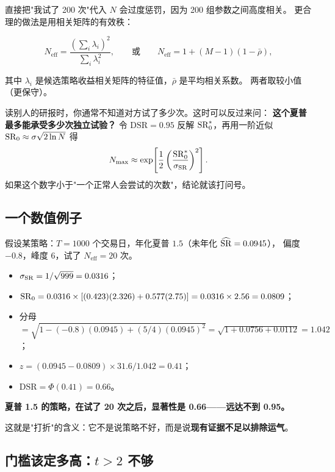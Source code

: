 直接把"我试了 200 次"代入 $N$ 会过度惩罚，因为 200 组参数之间高度相关。
更合理的做法是用相关矩阵的有效秩：

\begin{equation}
  N_{\text{eff}} = \frac{(\sum_i \lambda_i)^2}{\sum_i \lambda_i^2},
  \qquad \text{或} \qquad
  N_{\text{eff}} = 1 + (M-1)(1-\bar\rho),
  \label{eq:neff}
\end{equation}

其中 $\lambda_i$ 是候选策略收益相关矩阵的特征值，$\bar\rho$ 是平均相关系数。
两者取较小值（更保守）。

\begin{warnbox}[当试验次数未知时]
读别人的研报时，你通常不知道对方试了多少次。这时可以反过来问：
\textbf{这个夏普最多能承受多少次独立试验？}
令 $\mathrm{DSR}=0.95$ 反解 $\mathrm{SR}_0^*$，再用一阶近似 $\mathrm{SR}_0\approx\sigma\sqrt{2\ln N}$ 得
\begin{equation}
  N_{\max} \approx \exp\!\left[\frac12\left(\frac{\mathrm{SR}_0^*}{\sigma_{\mathrm{SR}}}\right)^2\right].
\end{equation}
如果这个数字小于"一个正常人会尝试的次数"，结论就该打问号。
\end{warnbox}

\subsection{一个数值例子}

假设某策略：$T=1000$ 个交易日，年化夏普 $1.5$（未年化 $\widehat{\mathrm{SR}}=0.0945$），
偏度 $-0.8$，峰度 $6$，试了 $N_{\text{eff}}=20$ 次。

\begin{itemize}
  \item $\sigma_{\mathrm{SR}} = 1/\sqrt{999} = 0.0316$；
  \item $\mathrm{SR}_0 = 0.0316\times[(0.423)(2.326) + 0.577(2.75)] = 0.0316\times 2.56 = 0.0809$；
  \item 分母 $=\sqrt{1 - (-0.8)(0.0945) + (5/4)(0.0945)^2} = \sqrt{1+0.0756+0.0112}=1.042$；
  \item $z = (0.0945-0.0809)\times31.6/1.042 = 0.41$；
  \item $\mathrm{DSR} = \Phi(0.41) = 0.66$。
\end{itemize}

\textbf{夏普 1.5 的策略，在试了 20 次之后，显著性是 0.66——远达不到 0.95。}

这就是"打折"的含义：它不是说策略不好，而是说\textbf{现有证据不足以排除运气}。

\subsection{门槛该定多高：$t>2$ 不够}

